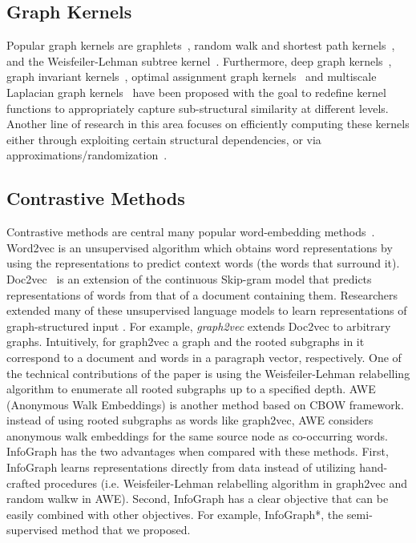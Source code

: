 \documentclass{article} \usepackage{iclr2020_conference,times}
\begin{document}
\subsection{Graph Kernels}
Popular graph kernels are  graphlets~\cite{prvzulj2007biological,shervashidze2009efficient}, random walk and shortest path kernels~\cite{kashima2003marginalized,borgwardt2005shortest}, and the Weisfeiler-Lehman subtree kernel~\cite{shervashidze2011weisfeiler}. Furthermore, deep graph kernels~\cite{yanardag2015deep}, graph invariant  kernels~\cite{orsini2015graph}, optimal assignment graph kernels~\cite{kriege2016valid}  and  multiscale Laplacian graph kernels~\cite{kondor2016multiscale} have been proposed with the goal to redefine kernel functions to appropriately capture sub-structural similarity at different levels. Another line of research in this area focuses on efficiently computing these kernels either through exploiting certain structural dependencies, or via approximations/randomization~\cite{feragen2013scalable,de2013fast,neumann2012efficient}.

\subsection{Contrastive Methods}
Contrastive methods are central many popular word-embedding methods~\cite{collobert2008unified, mnih2013learning, mikolov2013distributed}. Word2vec \cite{mikolov2013efficient} is an unsupervised algorithm which obtains word representations by using the representations to predict context words (the words that surround it). Doc2vec~\cite{le2014distributed} is an extension of the continuous Skip-gram model that predicts representations of words from that of a document containing them. Researchers extended many of these unsupervised language models to learn representations of graph-structured input \cite{sub2vec,narayanan2017graph2vec}. For example,  \textit{graph2vec} \cite{narayanan2017graph2vec} extends Doc2vec to arbitrary graphs. Intuitively, for graph2vec a graph and the rooted subgraphs in it correspond to a document and words in a paragraph vector, respectively. One of the technical contributions of the paper is using the Weisfeiler-Lehman relabelling algorithm \cite{weisfeiler1968reduction,shervashidze2011weisfeiler} to enumerate all rooted subgraphs up to a specified depth. AWE (Anonymous Walk Embeddings) \cite{ivanov2018anonymous} is another method based on CBOW framework.  instead of using rooted subgraphs as words like graph2vec, AWE considers anonymous walk embeddings for the same source node as co-occurring words. InfoGraph has the two advantages when compared with these methods.
First, InfoGraph learns representations directly from data instead of utilizing hand-crafted procedures (i.e. Weisfeiler-Lehman relabelling algorithm in graph2vec and random walkw in AWE). Second, InfoGraph has a clear objective that can be easily combined with other objectives. For example, InfoGraph*, the semi-supervised method that we proposed.
\end{document}
